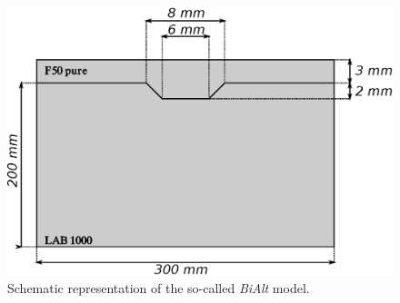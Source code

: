 \documentclass[manuscript,revised]{geophysics}
\begin{document}
\begin{figure}[!h]
	\centering
	\includegraphics[scale=0.5]{fig/bialt_model.eps}
	\caption{Schematic representation of the so-called \textit{BiAlt} model.}
	\label{panel_bialt_model}
\end{figure}

\end{document}
